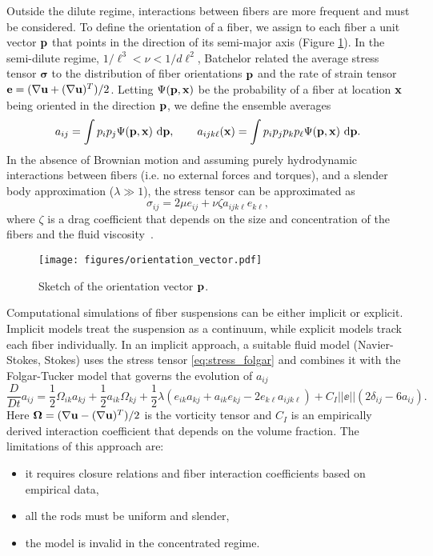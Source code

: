 Outside the dilute regime, interactions between fibers are more frequent and must be considered. To define the orientation of a fiber, we assign to each fiber a unit vector ${\mathbf{p}}$ that points in the direction of its semi-major axis (Figure \ref{fig:pp}).  In the semi-dilute regime, $1/\ell^3 < \nu < 1/d\ell^2$, Batchelor related the average stress tensor $\bm{\sigma}$ to the distribution of fiber orientations ${\mathbf{p}}$ and the rate of strain tensor ${\mathbf{e}} = (\nabla{\mathbf{u}} + (\nabla{\mathbf{u}})^T)/2$.  
Letting $\Psi({\mathbf{p}},{\mathbf{x}})$ be the probability of a fiber at location ${\mathbf{x}}$ being oriented in the direction ${\mathbf{p}}$, we define the ensemble averages
\[a_{ij} =\int p_i p_j \Psi({\mathbf{p}},{\mathbf{x}})~\text{d}{\mathbf{p}}, \qquad a_{ijk\ell}({\mathbf{x}}) = \int p_i p_j p_k p_{\ell}\Psi({\mathbf{p}},{\mathbf{x}})~\text{d}{\mathbf{p}}.\]
In the absence of Brownian motion and assuming purely hydrodynamic interactions between fibers (i.e. no external forces and torques), and a slender body approximation ($\lambda \gg 1$), the stress tensor can be approximated as
\begin{equation}\label{eq:stress_folgar} \sigma_{ij} = 2\mu e_{ij} + \nu\zeta a_{ijk\ell} e_{k\ell},\end{equation}
where $\zeta$ is a drag coefficient that depends on the size and concentration of the fibers and the fluid viscosity~\cite{Batchelor1971}.

\begin{figure}[!h]
\begin{center}
\texttt{[image: figures/orientation\_vector.pdf]}
\end{center}
\caption[Sketch of the orientation vector]{Sketch of the orientation vector ${\mathbf{p}}$.}\label{fig:pp}
\end{figure}
Computational simulations of fiber suspensions can be either implicit or explicit. Implicit models treat the suspension as a continuum, while explicit models track each fiber individually. In an implicit approach, a suitable fluid model (Navier-Stokes, Stokes) uses the stress tensor \eqref{eq:stress_folgar} and combines it with the Folgar-Tucker model  \cite{Folgar1984, Jack2006} that governs the evolution of $a_{ij}$ 
\[ \frac{D}{D t}a_{ij} = \frac{1}{2}\Omega_{ik}a_{kj} + \frac{1}{2}a_{ik}\Omega_{kj} + \frac{1}{2}\lambda\left(e_{ik}a_{kj} + a_{ik}e_{kj} - 2e_{k\ell}a_{ijk\ell}\right) + C_I ||\ee||(2\delta_{ij} - 6a_{ij}).\]
Here $\bm{\Omega} = (\nabla {\mathbf{u}} - (\nabla{\mathbf{u}})^T)/2$ is the vorticity tensor and $C_I$ is an empirically derived interaction coefficient that depends on the volume fraction. The limitations of this approach are:
\begin{itemize}
	\item it requires closure relations and fiber interaction coefficients based on empirical data,
	\item all the rods must be uniform and slender,
	\item the model is invalid in the concentrated regime.
\end{itemize}

